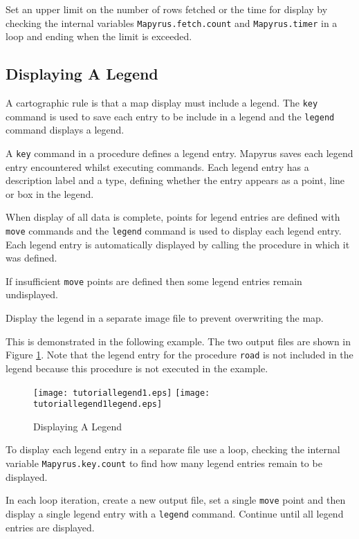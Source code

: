 Set an upper limit on the number of rows fetched or the time for display by
checking the internal variables \texttt{Mapyrus.fetch.count} and
\texttt{Mapyrus.timer} in a loop and ending when the limit is exceeded.

\subsection{Displaying A Legend}

A cartographic rule is that a map display must include a legend.  The
\texttt{key} command is used to save each entry to be include in a legend and
the \texttt{legend} command displays a legend.

A \texttt{key} command in a procedure defines a legend entry.  Mapyrus saves
each legend entry encountered whilst executing commands.  Each legend entry has
a description label and a type, defining whether the entry appears as a point,
line or box in the legend.

When display of all data is complete, points for legend entries are defined
with \texttt{move} commands and the \texttt{legend} command is used to display
each legend entry.  Each legend entry is automatically displayed by calling the
procedure in which it was defined.

If insufficient \texttt{move} points are defined then some legend entries
remain undisplayed.

Display the legend in a separate image file to prevent overwriting the map.

This is demonstrated in the following example.
The two output files are shown in Figure \ref{tutoriallegend1}.
Note that the legend entry for the procedure \texttt{road} is
not included in the legend because this procedure is not
executed in the example.



\begin{figure}[htb]
\texttt{[image: tutoriallegend1.eps]}
\texttt{[image: tutoriallegend1legend.eps]}
\caption{Displaying A Legend}
\label{tutoriallegend1}
\end{figure}

To display each legend entry in a separate file use a loop, checking the
internal variable \texttt{Mapyrus.key.count} to find how many legend entries
remain to be displayed.

In each loop iteration, create a new output file, set a single \texttt{move}
point and then display a single legend entry with a \texttt{legend} command.
Continue until all legend entries are displayed.

